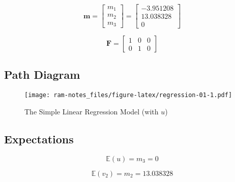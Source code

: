 \documentclass[
]{book}
\begin{document}
\begin{equation}
  \mathbf{m}
  =
  \begin{bmatrix}
    m_1 \\
    m_2 \\
    m_3
  \end{bmatrix}
  =
  \begin{bmatrix}
    -3.951208 \\
    13.038328 \\
    0
  \end{bmatrix}
\end{equation}

\begin{equation}
  \mathbf{F}
  =
  \begin{bmatrix}
    1 & 0 & 0 \\
    0 & 1 & 0
  \end{bmatrix}
\end{equation}

\hypertarget{path-diagram}{%
\subsection{Path Diagram}\label{path-diagram}}

\begin{figure}
\centering
\texttt{[image: ram-notes\_files/figure-latex/regression-01-1.pdf]}
\caption{\label{fig:regression-01}The Simple Linear Regression Model (with \(u\))}
\end{figure}

\hypertarget{expectations}{%
\subsection{Expectations}\label{expectations}}

\begin{equation}
  \mathbb{E}
  \left(
    u
  \right)
  =
  m_3
  =
  0
\end{equation}

\begin{equation}
  \mathbb{E}
  \left(
    v_2
  \right)
  =
  m_2
  =
  13.038328
\end{equation}
\end{document}
